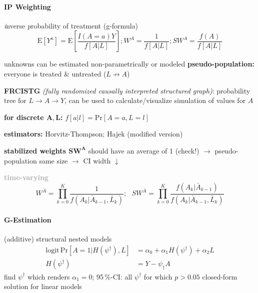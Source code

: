 \documentclass[8pt,twoside]{extarticle}
\begin{document}
\begin{multicols}{2}
\paragraph{IP Weighting} \textit{i}nverse \textit{p}robability of treatment (g-formula)
$$\mathrm{E}\left[Y^{a}\right] = \mathrm{E}\left[\frac{I(A=a)Y}{f\left[A|L\right]}\right]; W^A=\frac{1}{f\left[A|L\right]}; SW^A = \frac{f(A)}{f\left[A|L\right]}$$

\noindent unknowns can be estimated non-parametrically or modeled
\noindent \textbf{pseudo-population:} everyone is treated \& untreated ($L\not\to A$)

\noindent \textbf{FRCISTG} \textit{(fully randomized causally interpreted structured graph)}: probability tree for $L \rightarrow A \rightarrow Y$, can be used to calculate/visualize simulation of values for $A$ 

\noindent \textbf{for discrete $\boldsymbol{A, L}$:} $f\left[a|l\right] = \mathrm{Pr}\left[A=a,L=l\right]$

\noindent \textbf{estimators:} Horvitz-Thompson; Hajek (modified version) %

\noindent \textbf{stabilized weights $\boldsymbol{SW^A}$} should have an average of 1 (check!) $\rightarrow$ pseudo-population same size $\rightarrow$ CI width $\downarrow$

\vspace{0.2em}
\noindent \colorbox{lightgray!20!white}{\begin{minipage}{28em}




\textbf{\textcolor{darkgray}{time-varying}}
$$ W^{\bar{A}} = \prod_{k=0}^K \frac{1}{f\left(A_k|\bar{A}_{k-1}, \bar{L}_k\right)}; \,\,\,\, SW^{\bar{A}} = \prod_{k=0}^K \frac{f\left(A_k|\bar{A}_{k-1}\right)}{f\left(A_k|\bar{A}_{k-1}, \bar{L}_k\right)}$$

\end{minipage}}



















\paragraph{G-Estimation} (additive) structural nested models %
\begin{align*}
\mathrm{logit} \, \mathrm{Pr}\left[A=1|H(\psi^\dagger), L\right] &= \alpha_0 + \alpha_1H(\psi^\dagger) + \alpha_2L \\
H(\psi^\dagger) &= Y - \psi_\dagger A
\end{align*}
find $\psi^\dagger$ which renders $\alpha_1=0$; 95\,\%-CI: all $\psi^\dagger$ for which $p>0.05$
closed-form solution for linear models



\end{multicols}
\end{document}
